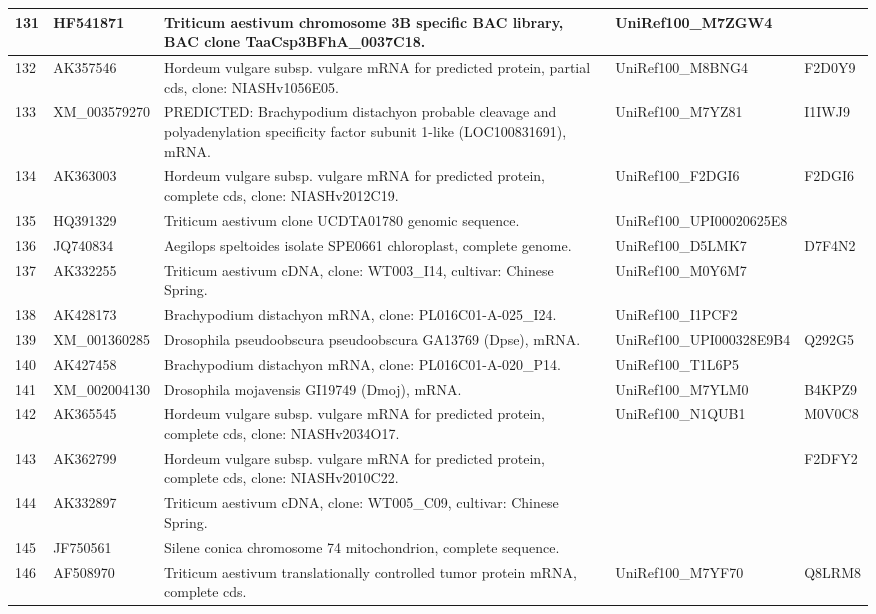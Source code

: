 {\begin{longtable}{|p{1.5cm}|p{2cm}|p{6cm}|p{3cm}|p{2cm}|}
\hline
131 & HF541871 & Triticum aestivum chromosome 3B specific BAC library, BAC clone TaaCsp3BFhA\_0037C18. & UniRef100\_M7ZGW4 & \\
\hline
132 & AK357546 & Hordeum vulgare subsp. vulgare mRNA for predicted protein, partial cds, clone: NIASHv1056E05. & UniRef100\_M8BNG4 & F2D0Y9\\
\hline
133 & XM\_003579270 & PREDICTED: Brachypodium distachyon probable cleavage and polyadenylation specificity factor subunit 1-like (LOC100831691), mRNA. & UniRef100\_M7YZ81 & I1IWJ9\\
\hline
134 & AK363003 & Hordeum vulgare subsp. vulgare mRNA for predicted protein, complete cds, clone: NIASHv2012C19. & UniRef100\_F2DGI6 & F2DGI6\\
\hline
135 & HQ391329 & Triticum aestivum clone UCDTA01780 genomic sequence. & UniRef100\_UPI00020625E8 & \\
\hline
136 & JQ740834 & Aegilops speltoides isolate SPE0661 chloroplast, complete genome. & UniRef100\_D5LMK7 & D7F4N2\\
\hline
137 & AK332255 & Triticum aestivum cDNA, clone: WT003\_I14, cultivar: Chinese Spring. & UniRef100\_M0Y6M7 & \\
\hline
138 & AK428173 & Brachypodium distachyon mRNA, clone: PL016C01-A-025\_I24. & UniRef100\_I1PCF2 & \\
\hline
139 & XM\_001360285 & Drosophila pseudoobscura pseudoobscura GA13769 (Dpse\backslashGA13769), mRNA. & UniRef100\_UPI000328E9B4 & Q292G5\\
\hline
140 & AK427458 & Brachypodium distachyon mRNA, clone: PL016C01-A-020\_P14. & UniRef100\_T1L6P5 & \\
\hline
141 & XM\_002004130 & Drosophila mojavensis GI19749 (Dmoj\backslashGI19749), mRNA. & UniRef100\_M7YLM0 & B4KPZ9\\
\hline
142 & AK365545 & Hordeum vulgare subsp. vulgare mRNA for predicted protein, complete cds, clone: NIASHv2034O17. & UniRef100\_N1QUB1 & M0V0C8\\
\hline
143 & AK362799 & Hordeum vulgare subsp. vulgare mRNA for predicted protein, complete cds, clone: NIASHv2010C22. &  & F2DFY2\\
\hline
144 & AK332897 & Triticum aestivum cDNA, clone: WT005\_C09, cultivar: Chinese Spring. &  & \\
\hline
145 & JF750561 & Silene conica chromosome 74 mitochondrion, complete sequence. &  & \\
\hline
146 & AF508970 & Triticum aestivum translationally controlled tumor protein mRNA, complete cds. & UniRef100\_M7YF70 & Q8LRM8\\

\end{longtable}}
